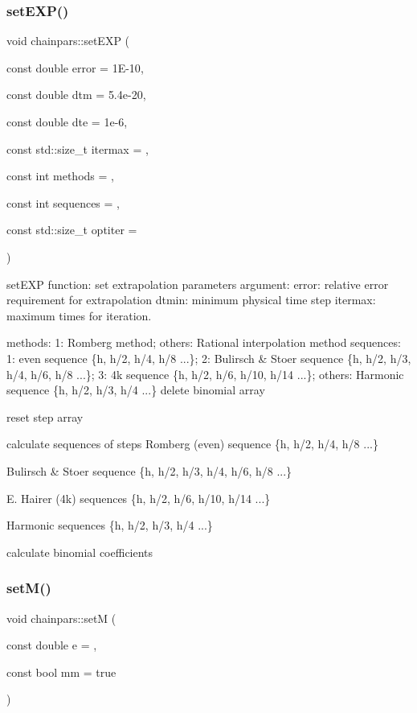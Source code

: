 \subsubsection{\texorpdfstring{set\+E\+X\+P()}{setEXP()}}
{\footnotesize\ttfamily void chainpars\+::set\+E\+XP (\begin{DoxyParamCaption}\item[{const double}]{error = {\ttfamily 1E-\/10},  }\item[{const double}]{dtm = {\ttfamily 5.4e-\/20},  }\item[{const double}]{dte = {\ttfamily 1e-\/6},  }\item[{const std\+::size\+\_\+t}]{itermax = {},  }\item[{const int}]{methods = {},  }\item[{const int}]{sequences = {},  }\item[{const std\+::size\+\_\+t}]{optiter = {} }\end{DoxyParamCaption})\hspace{0.3cm}{\ttfamily [inline]}}



set\+E\+XP function\+: set extrapolation parameters argument\+: error\+: relative error requirement for extrapolation dtmin\+: minimum physical time step itermax\+: maximum times for iteration. 

methods\+: 1\+: Romberg method; others\+: Rational interpolation method sequences\+: 1\+: even sequence \{h, h/2, h/4, h/8 ...\}; 2\+: Bulirsch \& Stoer sequence \{h, h/2, h/3, h/4, h/6, h/8 ...\}; 3\+: 4k sequence \{h, h/2, h/6, h/10, h/14 ...\}; others\+: Harmonic sequence \{h, h/2, h/3, h/4 ...\} delete binomial array

reset step array

calculate sequences of steps Romberg (even) sequence \{h, h/2, h/4, h/8 ...\}

Bulirsch \& Stoer sequence \{h, h/2, h/3, h/4, h/6, h/8 ...\}

E. Hairer (4k) sequences \{h, h/2, h/6, h/10, h/14 ...\}

Harmonic sequences \{h, h/2, h/3, h/4 ...\}

calculate binomial coefficients \hypertarget{classchainpars_a1ca68735d5d1a6f0fbf25d4ab9d1e466}{}\label{classchainpars_a1ca68735d5d1a6f0fbf25d4ab9d1e466} 
\subsubsection{\texorpdfstring{set\+M()}{setM()}}
{\footnotesize\ttfamily void chainpars\+::setM (\begin{DoxyParamCaption}\item[{const double}]{e = {},  }\item[{const bool}]{mm = {\ttfamily true} }\end{DoxyParamCaption})\hspace{0.3cm}{\ttfamily [inline]}}



